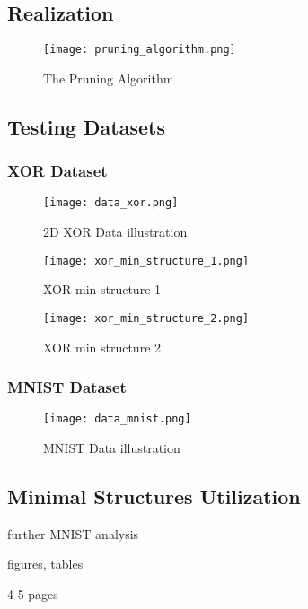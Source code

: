 \subsection{Realization}

\begin{figure}[H]
  \centering
  \texttt{[image: pruning\_algorithm.png]}
  \caption{The Pruning Algorithm}
  \label{img:pruning_algorithm}
\end{figure}

\subsection{Testing Datasets}

\subsubsection*{XOR Dataset}

\begin{figure}[H]
  \centering
  \texttt{[image: data\_xor.png]}
  \caption{2D XOR Data illustration}
  \label{img:data_xor}
\end{figure}

\begin{figure}[H]
  \centering
  \texttt{[image: xor\_min\_structure\_1.png]}
  \caption{XOR min structure 1}
  \label{img:xor_min_structure_1}
\end{figure}

\begin{figure}[H]
  \centering
  \texttt{[image: xor\_min\_structure\_2.png]}
  \caption{XOR min structure 2}
  \label{img:xor_min_structure_2}
\end{figure}

\subsubsection*{MNIST Dataset}

\begin{figure}[H]
  \centering
  \texttt{[image: data\_mnist.png]}
  \caption{MNIST Data illustration}
  \label{img:data_mnist}
\end{figure}

\subsection{Minimal Structures Utilization}
further MNIST analysis

figures, tables

4-5 pages